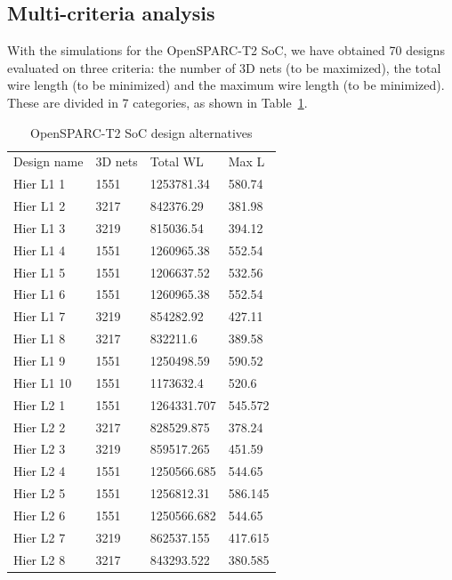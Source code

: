 \documentclass{svmult}
\begin{document}


\subsection{Multi-criteria analysis}
With the simulations for the OpenSPARC-T2 SoC, we have obtained 70 designs evaluated on three criteria: the number of 3D nets (to be maximized), the total wire length (to be minimized) and the maximum wire length (to be minimized). These are divided in 7 categories, as shown in Table~\ref{tab:alternatives}.

\begin{small}
\begin{longtable}{p{2.3cm}p{1.5cm}p{2cm}p{1.3cm}}
    \caption{OpenSPARC-T2 SoC design alternatives}
    \label{tab:alternatives}\vspace{-8pt}\\
    \hline
    Design name & 3D nets & Total WL & Max L\\
    \hline
    Hier L1 1 & 1551 & 1253781.34 & 580.74 \\
    Hier L1 2 & 3217 & 842376.29 & 381.98 \\
    Hier L1 3 & 3219 & 815036.54 & 394.12 \\
    Hier L1 4 & 1551 & 1260965.38 & 552.54 \\
    Hier L1 5 & 1551 & 1206637.52 & 532.56 \\
    Hier L1 6 & 1551 & 1260965.38 & 552.54 \\
    Hier L1 7 & 3219 & 854282.92 & 427.11 \\
    Hier L1 8 & 3217 & 832211.6 & 389.58 \\
    Hier L1 9 & 1551 & 1250498.59 & 590.52 \\
    Hier L1 10 & 1551 & 1173632.4 & 520.6 \\
    \hline
    Hier L2 1 & 1551 & 1264331.707 & 545.572 \\
    Hier L2 2 & 3217 & 828529.875 & 378.24 \\
    Hier L2 3 & 3219 & 859517.265 & 451.59 \\
    Hier L2 4 & 1551 & 1250566.685 & 544.65 \\
    Hier L2 5 & 1551 & 1256812.31 & 586.145 \\
    Hier L2 6 & 1551 & 1250566.682 & 544.65 \\
    Hier L2 7 & 3219 & 862537.155 & 417.615 \\
    Hier L2 8 & 3217 & 843293.522 & 380.585 \\

\end{longtable}
\end{small}
\end{document}

